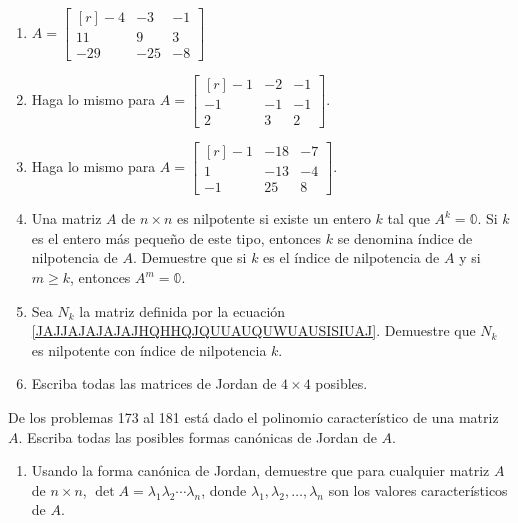 \begin{enumerate}[start=167]
    \item $A=\begin{bmatrix*}[r]-4 & -3 & -1 \\ 11 & 9 & 3 \\ -29 & -25 & -8\end{bmatrix*}$
    \item Haga lo mismo para $A=\begin{bmatrix*}[r]-1 & -2 & -1 \\ -1 & -1 & -1 \\ 2 & 3 & 2\end{bmatrix*}$.
    \item Haga lo mismo para $A=\begin{bmatrix*}[r]-1 & -18 & -7 \\ 1 & -13 & -4 \\ -1 & 25 & 8\end{bmatrix*}$.
    \item Una matriz $A$ de $n \times n$ es nilpotente si existe un entero $k$ tal que $A^{k}=\mathbb{0}$. Si $k$ es el entero más pequeño de este tipo, entonces $k$ se denomina índice de nilpotencia de $A$. Demuestre que si $k$ es el índice de nilpotencia de $A$ y si $m \geq k$, entonces $A^{m}=\mathbb{0}$.
    \item Sea $N_{k}$ la matriz definida por la ecuación \eqref{JAJJAJAJAJAJHQHHQJQUUAUQUWUAUSISIUAJ}. Demuestre que $N_{k}$ es nilpotente con índice de nilpotencia $k$.
    \item Escriba todas las matrices de Jordan de $4 \times 4$ posibles.
\end{enumerate}
De los problemas 173 al 181 está dado el polinomio característico de una matriz $A$. Escriba todas las posibles formas canónicas de Jordan de $A$.\newpage
\begin{multienumerate}
    \setcounter{multienumi}{172}
\end{multienumerate}
\begin{enumerate}[start=182]
    \item Usando la forma canónica de Jordan, demuestre que para cualquier matriz $A$ de $n \times n$, $\operatorname{det} A=\lambda_{1} \lambda_{2} \cdots \lambda_{n}$, donde $\lambda_{1}, \lambda_{2}, \dots, \lambda_{n}$ son los valores característicos de $A$.
\end{enumerate}
